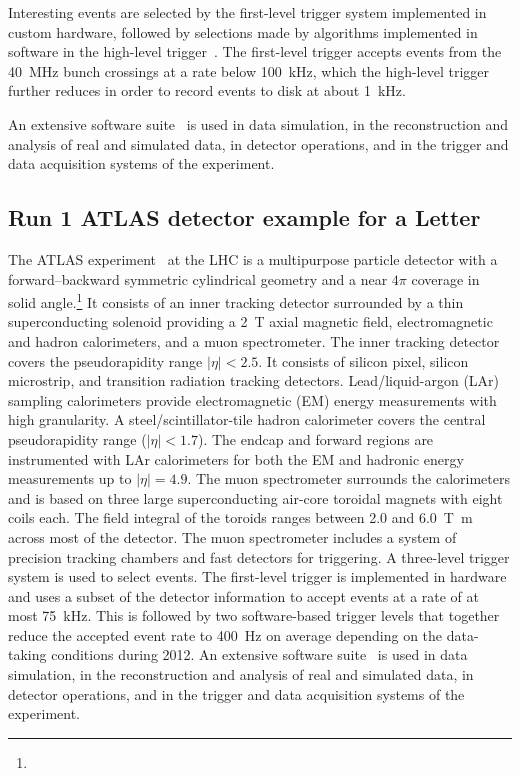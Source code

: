Interesting events are selected by the first-level trigger system implemented in custom hardware,
followed by selections made by algorithms implemented in software in the high-level trigger~\cite{TRIG-2016-01}. 
The first-level trigger accepts events from the \qty{40}{\MHz} bunch crossings at a rate below \qty{100}{\kHz},
which the high-level trigger further reduces in order to record events to disk at about \qty{1}{\kHz}.

An extensive software suite~\cite{ATL-SOFT-PUB-2021-001} is used in data simulation, in the reconstruction
and analysis of real and simulated data, in detector operations, and in the trigger and data acquisition
systems of the experiment.

\subsection{Run 1 ATLAS detector example for a Letter}
\label{sec:atlas1a}

The ATLAS experiment~\cite{PERF-2007-01} at the LHC is a multipurpose particle detector
with a forward--backward symmetric cylindrical geometry and a near \(4\pi\) coverage in 
solid angle.\footnote{\AtlasCoordFootnote}
It consists of an inner tracking detector surrounded by a thin superconducting solenoid
providing a \qty{2}{\tesla} axial magnetic field, electromagnetic and hadron calorimeters, and a muon spectrometer.
The inner tracking detector covers the pseudorapidity range \(|\eta| < 2.5\).
It consists of silicon pixel, silicon microstrip, and transition radiation tracking detectors.
Lead/liquid-argon (LAr) sampling calorimeters provide electromagnetic (EM) energy measurements
with high granularity.
A steel/scintillator-tile hadron calorimeter covers the central pseudorapidity range (\(|\eta| < 1.7\)).
The endcap and forward regions are instrumented with LAr calorimeters
for both the EM and hadronic energy measurements up to \(|\eta| = 4.9\).
The muon spectrometer surrounds the calorimeters and is based on
three large superconducting air-core toroidal magnets with eight coils each.
The field integral of the toroids ranges between \num{2.0} and \qty{6.0}{\tesla\metre}
across most of the detector. 
The muon spectrometer includes a system of precision tracking chambers and fast detectors for triggering.
A three-level trigger system is used to select events.
The first-level trigger is implemented in hardware and uses a subset of the detector information
to accept events at a rate of at most \qty{75}{\kilo\hertz}.
This is followed by two software-based trigger levels that
together reduce the accepted event rate to \qty{400}{\hertz} on average
depending on the data-taking conditions during 2012.
An extensive software suite~\cite{ATL-SOFT-PUB-2021-001} is used in data simulation, in the reconstruction
and analysis of real and simulated data, in detector operations, and in the trigger and data acquisition
systems of the experiment.


